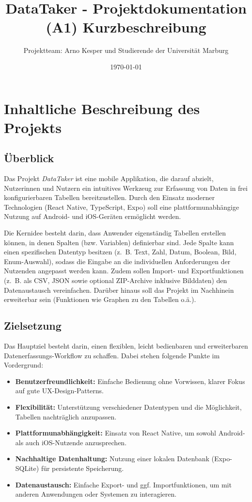 \documentclass[a4paper,12pt]{article}
\title{DataTaker - Projektdokumentation \\ \large (A1) Kurzbeschreibung}
\author{Projektteam: Arno Kesper und Studierende der Universität Marburg}
\date{\today}
\begin{document}
\maketitle

\section{Inhaltliche Beschreibung des Projekts}

\subsection{Überblick}
Das Projekt \emph{DataTaker} ist eine mobile Applikation, die darauf abzielt, Nutzerinnen und Nutzern ein intuitives Werkzeug zur Erfassung von Daten in frei konfigurierbaren Tabellen bereitzustellen. Durch den Einsatz moderner Technologien (React Native, TypeScript, Expo) soll eine plattformunabhängige Nutzung auf Android- und iOS-Geräten ermöglicht werden. 

Die Kernidee besteht darin, dass Anwender eigenständig Tabellen erstellen können, in denen Spalten (bzw. Variablen) definierbar sind. Jede Spalte kann einen spezifischen Datentyp besitzen (z.~B. Text, Zahl, Datum, Boolean, Bild, Enum-Auswahl), sodass die Eingabe an die individuellen Anforderungen der Nutzenden angepasst werden kann. Zudem sollen Import- und Exportfunktionen (z.~B. als CSV, JSON sowie optional ZIP-Archive inklusive Bilddaten) den Datenaustausch vereinfachen. Darüber hinaus soll das Projekt im Nachhinein erweiterbar sein (Funktionen wie Graphen zu den Tabellen o.ä.).

\subsection{Zielsetzung}
Das Hauptziel besteht darin, einen flexiblen, leicht bedienbaren und erweiterbaren Datenerfassungs-Workflow zu schaffen. Dabei stehen folgende Punkte im Vordergrund:

\begin{itemize}[leftmargin=1.5cm]
    \item \textbf{Benutzerfreundlichkeit:} Einfache Bedienung ohne Vorwissen, klarer Fokus auf gute UX-Design-Patterns.
    \item \textbf{Flexibilität:} Unterstützung verschiedener Datentypen und die Möglichkeit, Tabellen nachträglich anzupassen.
    \item \textbf{Plattformunabhängigkeit:} Einsatz von React Native, um sowohl Android- als auch iOS-Nutzende anzusprechen.
    \item \textbf{Nachhaltige Datenhaltung:} Nutzung einer lokalen Datenbank (Expo-SQLite) für persistente Speicherung.
    \item \textbf{Datenaustausch:} Einfache Export- und ggf. Importfunktionen, um mit anderen Anwendungen oder Systemen zu interagieren.
\end{itemize}
\end{document}
